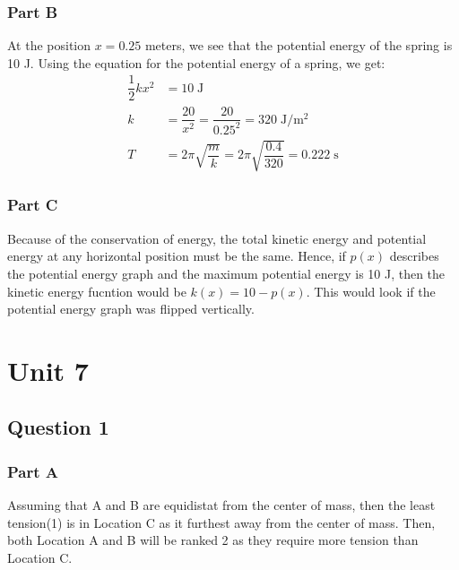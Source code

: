 \documentclass[]{scrartcl}
\begin{document}
\subsubsection*{Part B}
  At the position $x = 0.25$ meters, we see that the potential energy of the spring is 10 J. Using the equation for the potential energy of a spring, we get:
  \begin{align*}
    \dfrac12 kx^2 &= 10\;\mathrm{J} \\
    k &= \dfrac{20}{x^2} = \dfrac{20}{0.25^2} = 320 \;\mathrm{J/m^2} \\
    T &= 2\pi\sqrt{\dfrac{m}{k}} = 2\pi\sqrt{\dfrac{0.4}{320}} = \boxed{0.222\;\mathrm{s}}
  \end{align*}
\subsubsection*{Part C}
  Because of the conservation of energy, the  total kinetic energy and potential energy at any horizontal position must be the same. Hence, if $p(x)$ describes the potential energy graph and the maximum potential energy is 10 J, then the kinetic energy fucntion would be $k(x) = 10 - p(x)$. This would look if the potential energy graph was flipped vertically.

\section*{Unit 7}
\subsection*{Question 1}
\subsubsection*{Part A}
  Assuming that A and B are equidistat from the center of mass, then the least tension(1) is in Location C as it furthest away from the center of mass. Then, both Location A and B will be ranked 2 as they require more tension than Location C.
\end{document}

